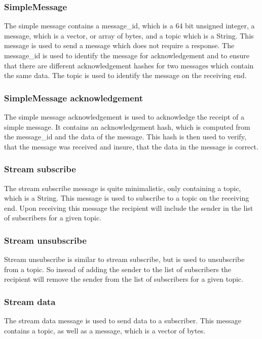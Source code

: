 \subsubsection{SimpleMessage}
The simple message contains a message\_id, which is a 64 bit unsigned integer, a message, which is a vector, or array of bytes,
and a topic which is a String. This message is used to send a message which does not require a response. 
The message\_id is used to identify the message for acknowledgement and to ensure that there are different acknowledgement hashes
for two messages which contain the same data. The topic is used to identify the message on the receiving end.

\subsubsection{SimpleMessage acknowledgement}
The simple message acknowledgement is used to acknowledge the receipt of a simple message. It contains an acknowledgement hash, which is computed
from the message\_id and the data of the message. This hash is then used to verify, that the message was received and insure, that the data in the
message is correct.

\subsubsection{Stream subscribe}
The stream subscribe message is quite minimalistic, only containing a topic, which is a String. This message is used to subscribe to a topic
on the receiving end. Upon receiving this message the recipient will include the sender in the list of subscribers for a given topic. 

\subsubsection{Stream unsubscribe}
Stream unsubscribe is similar to stream subscribe, but is used to unsubscribe from a topic. So insead of adding the sender to the list of subscribers
the recipient will remove the sender from the list of subscribers for a given topic.

\subsubsection{Stream data}
The stream data message is used to send data to a subscriber. This message contains a topic, as well as a message, which is a vector of bytes.

